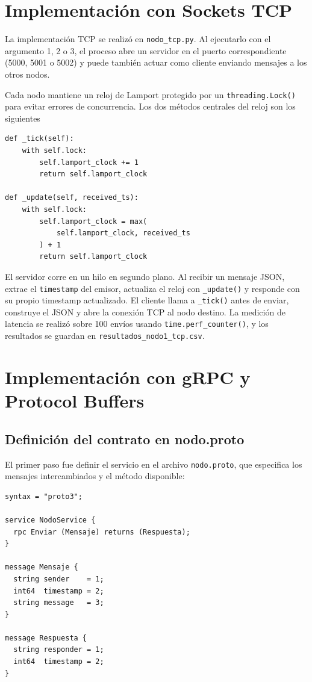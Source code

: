 \documentclass[12pt,a4paper]{article}
\begin{document}
\section{Implementación con Sockets TCP}

La implementación TCP se realizó en \texttt{nodo\_tcp.py}. Al ejecutarlo con el argumento 1, 2 o 3, el proceso abre un servidor en el puerto correspondiente (5000, 5001 o 5002) y puede también actuar como cliente enviando mensajes a los otros nodos.

Cada nodo mantiene un reloj de Lamport protegido por un \texttt{threading.Lock()} para evitar errores de concurrencia. Los dos métodos centrales del reloj son los siguientes

\newpage

\begin{lstlisting}
def _tick(self):
    with self.lock:
        self.lamport_clock += 1
        return self.lamport_clock

def _update(self, received_ts):
    with self.lock:
        self.lamport_clock = max(
            self.lamport_clock, received_ts
        ) + 1
        return self.lamport_clock
\end{lstlisting}

El servidor corre en un hilo en segundo plano. Al recibir un mensaje JSON, extrae el \texttt{timestamp} del emisor, actualiza el reloj con \texttt{\_update()} y responde con su propio timestamp actualizado. El cliente llama a \texttt{\_tick()} antes de enviar, construye el JSON y abre la conexión TCP al nodo destino. La medición de latencia se realizó sobre 100 envíos usando \texttt{time.perf\_counter()}, y los resultados se guardan en \texttt{resultados\_nodo1\_tcp.csv}.


\section{Implementación con gRPC y Protocol Buffers}

\subsection{Definición del contrato en nodo.proto}

El primer paso fue definir el servicio en el archivo \texttt{nodo.proto}, que especifica los mensajes intercambiados y el método disponible:

\begin{lstlisting}[language={}]
syntax = "proto3";

service NodoService {
  rpc Enviar (Mensaje) returns (Respuesta);
}

message Mensaje {
  string sender    = 1;
  int64  timestamp = 2;
  string message   = 3;
}

message Respuesta {
  string responder = 1;
  int64  timestamp = 2;
}
\end{lstlisting}
\end{document}
